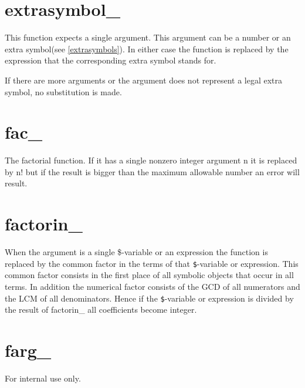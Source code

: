 
\section{extrasymbol\_}
\label{funextrasymbol}

\noindent This function expects a single argument. This argument can be a 
number or an extra symbol(see \ref{extrasymbols}). In either case the 
function is replaced by the expression that the corresponding extra symbol 
stands for.

\noindent If there are more arguments or the argument does not represent a 
legal extra symbol, no substitution is made.


\section{fac\_}
\label{funfac}
\noindent The factorial function. If it has a single nonzero 
integer argument n it is replaced by n! but if the result is bigger than 
the maximum allowable number an error will result.

 
\section{factorin\_}
\label{funfactorin}
\noindent When the argument is a single \$-variable or 
an expression the function is replaced by the common 
factor in the terms of that \verb:$:-variable or expression. This common 
factor consists in the first place of all symbolic objects that occur in 
all terms. In addition the numerical factor consists of the GCD 
of all numerators and the LCM of all denominators. Hence if the 
\verb:$:-variable or expression is divided by the result of factorin\_ all 
coefficients become integer.


\section{farg\_}
\label{funfarg}
\noindent For internal use only.


